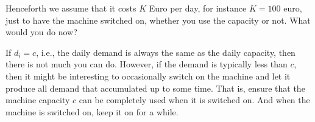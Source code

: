 \begin{exercise}
  Henceforth we assume that it costs $K$ Euro per day, for instance
  $K=100$ euro, just to have the machine switched on, whether you use
  the capacity or not. What would you do now? 
  \begin{solution}
    If $d_i=c$, i.e., the daily demand is always the same as the daily
    capacity, then there is not much you can do. However, if the
    demand is typically less than $c$, then it might be interesting to
    occasionally switch on the machine and let it produce all demand
    that accumulated up to some time. That is, ensure that the machine capacity $c$ can
    be completely used when it is switched on.  And when the machine is switched on, keep it on for a while.
  \end{solution}
\end{exercise}



